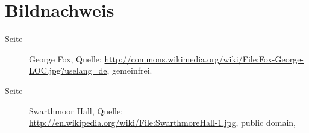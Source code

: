 
\section*{Bildnachweis}


\begin{description}
 \item[Seite \pageref{bild:gfox}] George Fox, Quelle: \url{http://commons.wikimedia.org/wiki/File:Fox-George-LOC.jpg?uselang=de}, gemeinfrei.
 \item[Seite \pageref{bild:swarthmoor}] Swarthmoor Hall, Quelle: \url{http://en.wikipedia.org/wiki/File:SwarthmoreHall-1.jpg}, public domain,  

\end{description}